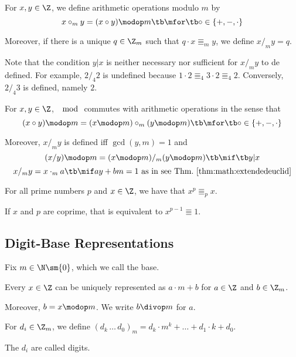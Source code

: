 \begin{definition}\label{def:math:moduloarith}
For $x,y\in\Z$, we define arithmetic operations modulo $m$ by \[x\circ_m y = (x\circ y)\modop m \tb\mfor\tb \circ \in\{+,-,\cdot\}\]

Moreover, if there is a unique $q\in\Z_m$ such that $q\cdot x\Equiv_m y$, we define $x/_m y=q$.
\end{definition}

Note that the condition $y|x$ is neither necessary nor sufficient for $x/_m y$ to de defined.
For example, $2/_4 2$ is undefined because $1\cdot 2\Equiv_4 3\cdot 2\Equiv_4 2$.
Conversely, $2/_4 3$ is defined, namely $2$.

\begin{theorem}\label{thm:math:moduloarith}
For $x,y\in\Z$, $\mod$ commutes with arithmetic operations in the sense that
 \[(x\circ y)\modop m=(x\modop m)\circ_m (y\modop m) \tb\mfor\tb \circ \in\{+,-,\cdot\}\]

Moreover, $x/_m y$ is defined iff $\gcd(y,m)=1$ and
 \[(x/y)\modop m=(x \modop m)/_m (y\modop m) \tb\mif\tb y|x\]
 \[x/_m y=x\cdot_m a \tb\mif ay+bm=1 \text{ as in see Thm.~\ref{thm:math:extendedeuclid}}\]
\end{theorem}

\begin{theorem}\label{thm:math:fermatlittle}
For all prime numbers $p$ and $x\in\Z$, we have that $x^p\Equiv_p x$.

If $x$ and $p$ are coprime, that is equivalent to $x^{p-1}\Equiv 1$.
\end{theorem}

\subsection{Digit-Base Representations}\label{sec:math:base}

Fix $m\in \N\sm\{0\}$, which we call the base.
\medskip

\begin{theorem}
Every $x\in\Z$ can be uniquely represented as $a\cdot m+b$ for $a\in\Z$ and $b\in\Z_m$.

Moreover, $b=x\modop m$.
We write $b\divop m$ for $a$.
\end{theorem}

\begin{definition}\label{def:math:base}
For $d_i\in\Z_m$, we define $(d_k\,\ldots\,d_0)_m =d_k\cdot m^k+\ldots+d_1\cdot k+d_0$.

The $d_i$ are called digits.
\end{definition}

